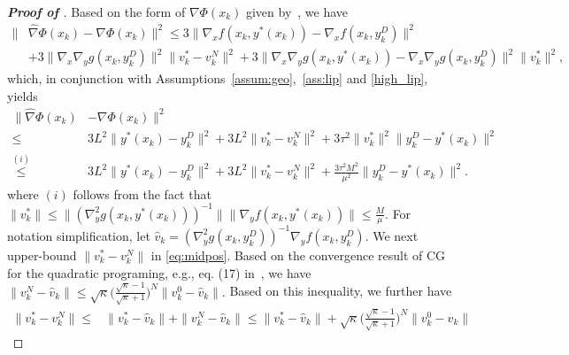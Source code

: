 \documentclass{osudissert96}
\begin{document}
\begin{proof}[\bf Proof of ]
Based on the form of $\nabla\Phi(x_k)$ given by~,  we have 
\begin{align*}
\|&\widehat \nabla \Phi(x_k)- \nabla \Phi(x_k)\|^2 \leq 3\|\nabla_x f(x_k,y^*(x_k))-\nabla_x f(x_k,y_k^D)\|^2   \nonumber
\\&+3\|\nabla_x \nabla_y g(x_k,y_k^D)\|^2\|v_k^*-v_k^N\|^2+ 3\|\nabla_x \nabla_y g(x_k,y^*(x_k))-\nabla_x \nabla_y g(x_k,y_k^D) \|^2 \|v_k^*\|^2,
\end{align*}
which, in conjunction with Assumptions~\ref{assum:geo},~\ref{ass:lip} and \ref{high_lip}, yields
\begin{align}\label{eq:midpos}
\|\widehat \nabla \Phi(x_k)&- \nabla \Phi(x_k)\|^2  \nonumber
\\\leq &3L^2\|y^*(x_k)-y_k^D\|^2 + 3L^2\|v_k^*-v_k^N\|^2+3\tau^2\|v_k^*\|^2\|y_k^D-y^*(x_k)\|^2\nonumber
\\\overset{(i)}\leq&  3L^2\|y^*(x_k)-y_k^D\|^2 + 3L^2\|v_k^*-v_k^N\|^2+\frac{3\tau^2 M^2}{\mu^2}\|y_k^D-y^*(x_k)\|^2.
\end{align}
where $(i)$ follows from the fact that $\|v_k^*\|\leq\|(\nabla_y^2g(x_k,y^*(x_k)))^{-1}\|\|\nabla_y f(x_k,y^*(x_k))\|\leq \frac{M}{\mu}$.   %
For notation simplification, let $\widehat v_k=(\nabla_y^2g(x_k,y^D_k))^{-1}\nabla_y f(x_k,y^D_k)$.  We next  upper-bound $\|v_k^*-v_k^N\|$ in \cref{eq:midpos}. Based on the convergence result of CG for the quadratic programing, e.g., eq. (17) in~\cite{grazzi2020iteration}, we have 
 $\|v_k^N-\widehat v_k\| \leq \sqrt{\kappa}\Big( \frac{\sqrt{\kappa}-1}{\sqrt{\kappa}+1} \Big)^N\|v_k^0-\widehat v_k\|.$
Based on this inequality, we further have 
 \begin{align}\label{eq:letknca}
 \|v_k^*-v_k^N\| \leq &\|v_k^*-\widehat v_k\| + \|v_k^N-\widehat v_k\| \leq  \|v_k^*-\widehat v_k\|  +  \sqrt{\kappa}\Big( \frac{\sqrt{\kappa}-1}{\sqrt{\kappa}+1} \Big)^N\|v_k^0-\widehat v_k\| \nonumber

\end{align}
\end{proof}
\end{document}
